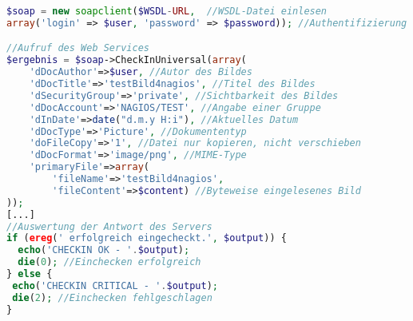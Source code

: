 \begin{lstlisting}[captionpos=b, caption=Anforderungsparameter des ersten Plugins, label=1stplugin, breaklines = true, language=PHP]
$soap = new soapclient($WSDL-URL,  //WSDL-Datei einlesen 
array('login' => $user, 'password' => $password)); //Authentifizierung am Oracle UCM-Server

//Aufruf des Web Services
$ergebnis = $soap->CheckInUniversal(array(
	'dDocAuthor'=>$user, //Autor des Bildes
	'dDocTitle'=>'testBild4nagios', //Titel des Bildes
	'dSecurityGroup'=>'private', //Sichtbarkeit des Bildes
	'dDocAccount'=>'NAGIOS/TEST', //Angabe einer Gruppe
	'dInDate'=>date("d.m.y H:i"), //Aktuelles Datum
	'dDocType'=>'Picture', //Dokumententyp
	'doFileCopy'=>'1', //Datei nur kopieren, nicht verschieben
	'dDocFormat'=>'image/png', //MIME-Type
	'primaryFile'=>array(
		'fileName'=>'testBild4nagios',
 		'fileContent'=>$content) //Byteweise eingelesenes Bild
));
[...]
//Auswertung der Antwort des Servers
if (ereg(' erfolgreich eingecheckt.', $output)) {
  echo('CHECKIN OK - '.$output);
  die(0); //Einchecken erfolgreich
} else {
 echo('CHECKIN CRITICAL - '.$output);
 die(2); //Einchecken fehlgeschlagen
}
\end{lstlisting}